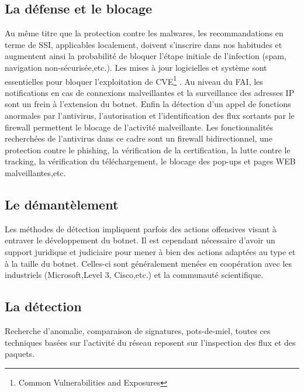 \subsection{La défense et le blocage}
Au même titre que la protection contre les malwares, les recommandations en terme de SSI, applicables localement, doivent s'inscrire dans nos habitudes et augmentent ainsi la probabilité de bloquer l'étape initiale de l'infection (spam, navigation non-sécurisée,etc.).
\newline Les mises à jour logicielles et système sont essentielles pour bloquer l'exploitation de CVE\footnote{Common Vulnerabilities and Exposures} .
\newline Au niveau du FAI, les notifications en cas de connexions malveillantes et la surveillance des adresses IP sont un frein à l'extension du botnet.
\newline Enfin la détection d'un appel de fonctions anormales par l'antivirus, l'autorisation et l’identification des flux sortants par le firewall permettent le blocage de l'activité malveillante.
Les fonctionnalités recherchées de l'antivirus dans ce cadre sont un firewall bidirectionnel, une protection contre le phishing, la vérification de la certification, la lutte contre le tracking, la vérification du téléchargement, le blocage des pop-ups et pages WEB malveillantes,etc. 

\subsection{Le démantèlement}
Les méthodes de détection impliquent parfois des actions offensives visant à entraver le développement du botnet.
Il est cependant nécessaire d'avoir un support juridique et judiciaire pour mener à bien des actions adaptées au type et à la taille du botnet.
Celles-ci sont généralement menées en coopération avec les industriels (Microsoft,Level 3, Cisco,etc.) et la communauté scientifique.


\subsection{La détection}
Recherche d'anomalie, comparaison de signatures, pots-de-miel, toutes ces techniques basées sur l'activité du réseau reposent sur l'inspection des flux et des paquets.

